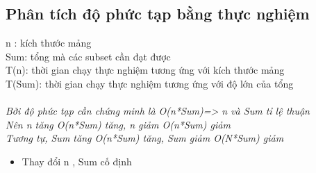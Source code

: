 \documentclass{article}
\begin{document}
    \subsection{ \fontsize{16}{16}\selectfont\textbf{Phân tích độ phức tạp bằng thực nghiệm}}
    
  n : kích thước mảng \\
 Sum: tổng mà các subset cần đạt được\\
T(n): thời gian chạy thực nghiệm tương ứng với kích thước mảng\\
T(Sum): thời gian chạy thực nghiệm tương ứng với độ lớn của tổng\\\\

\textit{Bởi độ phức tạp cần chứng minh là O(n*Sum)=> n và Sum tỉ lệ thuận\\
Nên n tăng O(n*Sum) tăng, n giảm O(n*Sum) giảm\\
Tương tự, Sum tăng O(n*Sum) tăng, Sum giảm O(N*Sum) giảm}
    \begin{itemize}
    \item     Thay đổi n , Sum cố định
    \end{itemize}
\end{document}
